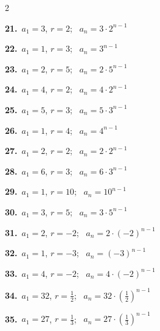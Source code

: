 \documentclass[11pt,letterpaper]{article}
\begin{document}
\begin{multicols}{2}\raggedright
{\color{fmwatch}\bfseries 21.}\ $a_1=3$, $r=2$; \ $a_n=3\cdot 2^{n-1}$\par\vspace{2.2mm}
{\color{fmwatch}\bfseries 22.}\ $a_1=1$, $r=3$; \ $a_n=3^{n-1}$\par\vspace{2.2mm}
{\color{fmwatch}\bfseries 23.}\ $a_1=2$, $r=5$; \ $a_n=2\cdot 5^{n-1}$\par\vspace{2.2mm}
{\color{fmwatch}\bfseries 24.}\ $a_1=4$, $r=2$; \ $a_n=4\cdot 2^{n-1}$\par\vspace{2.2mm}
{\color{fmwatch}\bfseries 25.}\ $a_1=5$, $r=3$; \ $a_n=5\cdot 3^{n-1}$\par\vspace{2.2mm}
{\color{fmwatch}\bfseries 26.}\ $a_1=1$, $r=4$; \ $a_n=4^{n-1}$\par\vspace{2.2mm}
{\color{fmwatch}\bfseries 27.}\ $a_1=2$, $r=2$; \ $a_n=2\cdot 2^{n-1}$\par\vspace{2.2mm}
{\color{fmwatch}\bfseries 28.}\ $a_1=6$, $r=3$; \ $a_n=6\cdot 3^{n-1}$\par\vspace{2.2mm}
{\color{fmwatch}\bfseries 29.}\ $a_1=1$, $r=10$; \ $a_n=10^{n-1}$\par\vspace{2.2mm}
{\color{fmwatch}\bfseries 30.}\ $a_1=3$, $r=5$; \ $a_n=3\cdot 5^{n-1}$\par\vspace{2.2mm}
{\color{fmwatch}\bfseries 31.}\ $a_1=2$, $r=-2$; \ $a_n=2\cdot (-2)^{n-1}$\par\vspace{2.2mm}
{\color{fmwatch}\bfseries 32.}\ $a_1=1$, $r=-3$; \ $a_n=(-3)^{n-1}$\par\vspace{2.2mm}
{\color{fmwatch}\bfseries 33.}\ $a_1=4$, $r=-2$; \ $a_n=4\cdot (-2)^{n-1}$\par\vspace{2.2mm}
{\color{fmwatch}\bfseries 34.}\ $a_1=32$, $r=\tfrac{1}{2}$; \ $a_n=32\cdot (\tfrac{1}{2})^{n-1}$\par\vspace{2.2mm}
{\color{fmwatch}\bfseries 35.}\ $a_1=27$, $r=\tfrac{1}{3}$; \ $a_n=27\cdot (\tfrac{1}{3})^{n-1}$\par\vspace{2.2mm}

\end{multicols}
\end{document}
